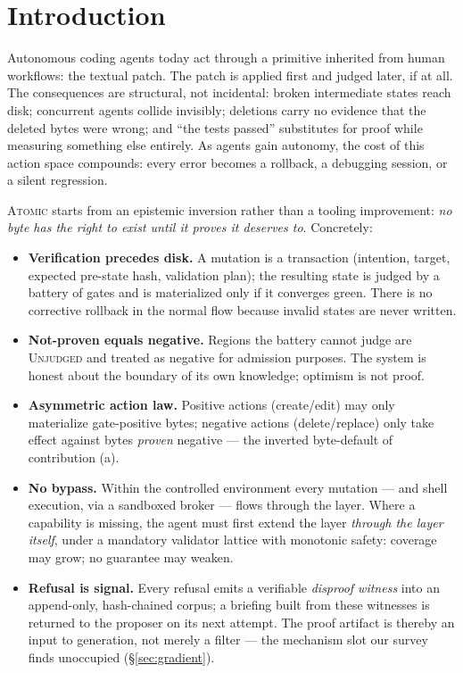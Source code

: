 \documentclass[11pt]{article}
\begin{document}
\section{Introduction}

Autonomous coding agents today act through a primitive inherited from human
workflows: the textual patch. The patch is applied first and judged later, if at
all. The consequences are structural, not incidental: broken intermediate states
reach disk; concurrent agents collide invisibly; deletions carry no evidence that
the deleted bytes were wrong; and ``the tests passed'' substitutes for proof while
measuring something else entirely. As agents gain autonomy, the cost of this
action space compounds: every error becomes a rollback, a debugging session, or a
silent regression.

\textsc{Atomic} starts from an epistemic inversion rather than a tooling
improvement: \emph{no byte has the right to exist until it proves it deserves to}.
Concretely:

\begin{itemize}
\item \textbf{Verification precedes disk.} A mutation is a transaction
  (intention, target, expected pre-state hash, validation plan); the resulting
  state is judged by a battery of gates and is materialized only if it
  converges green. There is no corrective rollback in the normal flow because
  invalid states are never written.
\item \textbf{Not-proven equals negative.} Regions the battery cannot judge are
  \textsc{Unjudged} and treated as negative for admission purposes. The system
  is honest about the boundary of its own knowledge; optimism is not proof.
\item \textbf{Asymmetric action law.} Positive actions (create/edit) may only
  materialize gate-positive bytes; negative actions (delete/replace) only take
  effect against bytes \emph{proven} negative --- the inverted byte-default of
  contribution (a).
\item \textbf{No bypass.} Within the controlled environment every mutation ---
  and shell execution, via a sandboxed broker --- flows through the layer. Where
  a capability is missing, the agent must first extend the layer \emph{through
  the layer itself}, under a mandatory validator lattice with monotonic safety:
  coverage may grow; no guarantee may weaken.
\item \textbf{Refusal is signal.} Every refusal emits a verifiable
  \emph{disproof witness} into an append-only, hash-chained corpus; a briefing
  built from these witnesses is returned to the proposer on its next attempt.
  The proof artifact is thereby an input to generation, not merely a filter ---
  the mechanism slot our survey finds unoccupied (\S\ref{sec:gradient}).
\end{itemize}
\end{document}
